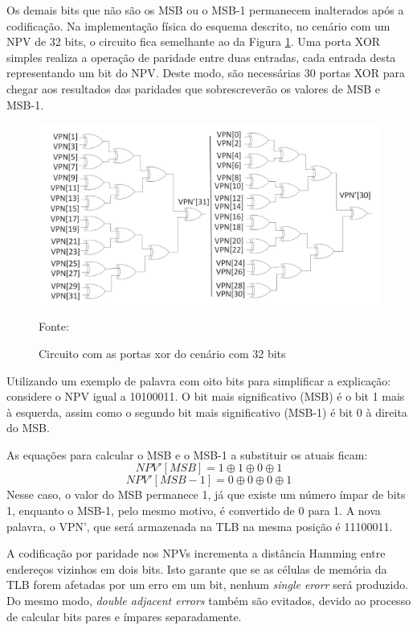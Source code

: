 Os demais bits que não são os MSB ou o MSB-1 permanecem inalterados após a codificação. Na implementação física do esquema descrito, no cenário com um NPV de 32 bits, o circuito fica semelhante ao da Figura \ref{fig:32}. Uma porta XOR simples realiza a operação de paridade entre duas entradas, cada entrada desta representando um bit do NPV. Deste modo, são necessárias 30 portas XOR para chegar aos resultados das paridades que sobrescreverão os valores de MSB e MSB-1.

\begin{figure}[ht]
\centering
\includegraphics[scale=0.7]{figuras/32bit.png}
\caption{Circuito com as portas xor do cenário com 32 bits}{Fonte: \cite{sanchez2019reducing}}
\label{fig:32}
\end{figure}

Utilizando um exemplo de palavra com oito bits para simplificar a explicação: considere o NPV igual a 10100011. O bit mais significativo (MSB) é o bit 1 mais à esquerda, assim como o segundo bit mais significativo (MSB-1) é bit 0 à direita do MSB.

As equações para calcular o MSB e o MSB-1 a substituir os atuais ficam: 
\begin{equation}
   NPV'[MSB] = 1 \oplus 1 \oplus 0 \oplus 1    
\end{equation}
\begin{equation}
    NPV'[MSB-1] = 0 \oplus 0 \oplus 0 \oplus 1
\end{equation}
Nesse caso, o valor do MSB permanece 1, já que existe um número ímpar de bits 1, enquanto o MSB-1, pelo mesmo motivo, é convertido de 0 para 1. A nova palavra, o VPN', que será armazenada na TLB na mesma posição é 11100011.

A codificação por paridade nos NPVs incrementa a distância Hamming entre endereços vizinhos em dois bits. Isto garante que se as células de memória da TLB forem afetadas por um erro em um bit, nenhum \textit{single erorr} será produzido. Do mesmo modo, \textit{double adjacent errors} também são evitados, devido ao processo de calcular bits pares e ímpares separadamente.

